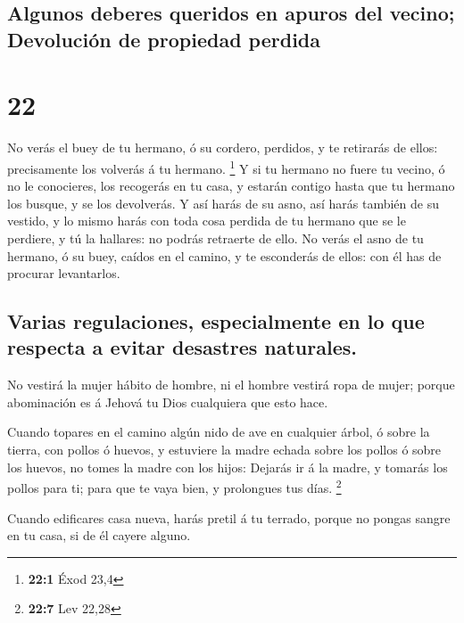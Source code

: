 \hypertarget{algunos-deberes-queridos-en-apuros-del-vecino-devoluciuxf3n-de-propiedad-perdida}{%
\subsection{Algunos deberes queridos en apuros del vecino; Devolución de
propiedad
perdida}\label{algunos-deberes-queridos-en-apuros-del-vecino-devoluciuxf3n-de-propiedad-perdida}}

\hypertarget{section-21}{%
\section{22}\label{section-21}}

 No verás el buey de tu hermano, ó su cordero, perdidos, y
te retirarás de ellos: precisamente los volverás á tu hermano.
\footnote{\textbf{22:1} Éxod 23,4}  Y si tu hermano no fuere
tu vecino, ó no le conocieres, los recogerás en tu casa, y estarán
contigo hasta que tu hermano los busque, y se los devolverás.
 Y así harás de su asno, así harás también de su vestido, y
lo mismo harás con toda cosa perdida de tu hermano que se le perdiere, y
tú la hallares: no podrás retraerte de ello.  No verás el
asno de tu hermano, ó su buey, caídos en el camino, y te esconderás de
ellos: con él has de procurar levantarlos.

\hypertarget{varias-regulaciones-especialmente-en-lo-que-respecta-a-evitar-desastres-naturales.}{%
\subsection{Varias regulaciones, especialmente en lo que respecta a
evitar desastres
naturales.}\label{varias-regulaciones-especialmente-en-lo-que-respecta-a-evitar-desastres-naturales.}}

 No vestirá la mujer hábito de hombre, ni el hombre vestirá
ropa de mujer; porque abominación es á Jehová tu Dios cualquiera que
esto hace.

 Cuando topares en el camino algún nido de ave en cualquier
árbol, ó sobre la tierra, con pollos ó huevos, y estuviere la madre
echada sobre los pollos ó sobre los huevos, no tomes la madre con los
hijos:  Dejarás ir á la madre, y tomarás los pollos para ti;
para que te vaya bien, y prolongues tus días. \footnote{\textbf{22:7}
  Lev 22,28}

 Cuando edificares casa nueva, harás pretil á tu terrado,
porque no pongas sangre en tu casa, si de él cayere alguno.

